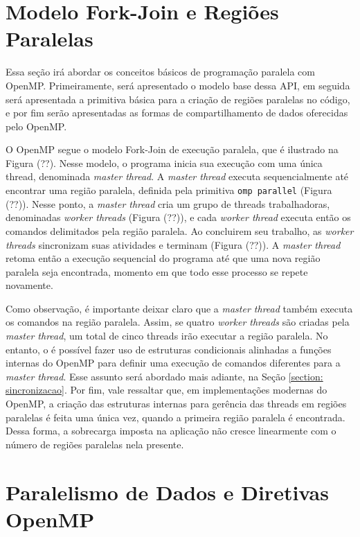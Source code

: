 \documentclass{SBCbookchapter}
\begin{document}
\section{Modelo Fork-Join e Regiões Paralelas}

	Essa seção irá abordar os conceitos básicos de programação paralela com
	OpenMP. Primeiramente, será apresentado o modelo base dessa API, em
	seguida será apresentada a primitiva básica para a criação de regiões
	paralelas no código, e por fim serão apresentadas as formas de
	compartilhamento de dados oferecidas pelo OpenMP.

	O OpenMP segue o modelo Fork-Join de execução paralela, que é ilustrado
	na Figura (??). Nesse modelo, o programa inicia sua execução com uma
	única thread, denominada \textit{master thread}. A \textit{master
	thread} executa sequencialmente até encontrar uma região paralela,
	definida pela primitiva \texttt{omp parallel} (Figura (??)). Nesse
	ponto, a \textit{master thread} cria um grupo de threads trabalhadoras,
	denominadas \textit{worker threads} (Figura (??)), e cada \textit{worker
	thread} executa então os comandos delimitados pela região paralela. Ao
	concluirem seu trabalho, as \textit{worker threads} sincronizam suas
	atividades e terminam (Figura (??)). A \textit{master thread} retoma
	então a execução sequencial do programa até que uma nova região paralela
	seja encontrada, momento em que todo esse processo se repete novamente.
	
	Como observação, é importante deixar claro que a \textit{master thread}
	também executa os comandos na região paralela. Assim, se quatro
	\textit{worker threads} são criadas pela \textit{master thread}, um
	total de cinco threads irão executar a região paralela. No entanto, o é
	possível fazer uso de estruturas condicionais alinhadas a funções
	internas do OpenMP para definir uma execução de comandos diferentes para
	a \textit{master thread}. Esse assunto será abordado mais adiante, na
	Seção \ref{section: sincronizacao}. Por fim, vale ressaltar que, em
	implementações modernas do OpenMP, a criação das estruturas internas
	para gerência das threads em regiões paralelas é feita uma única vez,
	quando a primeira região paralela é encontrada. Dessa forma, a
	sobrecarga imposta na aplicação não cresce linearmente com o número de
	regiões paralelas nela presente.

\section{Paralelismo de Dados e Diretivas OpenMP}
\end{document}
